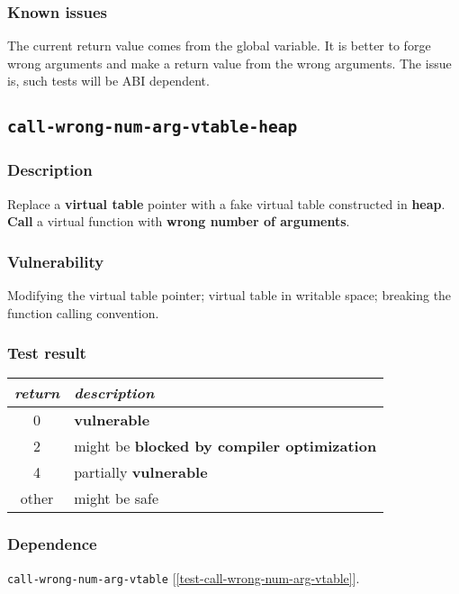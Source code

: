 \documentclass[a4paper]{book}
\begin{document}
\subsubsection{Known issues}
The current return value comes from the global variable.
It is better to forge wrong arguments and make a return value from the wrong arguments.
The issue is, such tests will be ABI dependent.

\newpage

\subsection{\texttt{call-wrong-num-arg-vtable-heap}}\label{test-call-wrong-num-arg-vtable-heap}

\subsubsection{Description}
Replace a \textbf{virtual table} pointer with a fake virtual table constructed in \textbf{heap}.
\textbf{Call} a virtual function with \textbf{wrong number of arguments}.

\subsubsection{Vulnerability}
Modifying the virtual table pointer; virtual table in writable space; breaking the function calling convention.

\subsubsection{Test result}
\begin{tabular}{cl}
  \toprule
  \emph{return}  & \emph{description} \\
  \midrule
  0              & \textbf{vulnerable} \\
  2              & might be \textbf{blocked by compiler optimization} \\
  4              & partially \textbf{vulnerable} \\
  other          & might be safe \\
  \bottomrule
\end{tabular}

\subsubsection{Dependence}

\texttt{call-wrong-num-arg-vtable} [\ref{test-call-wrong-num-arg-vtable}].
\end{document}
